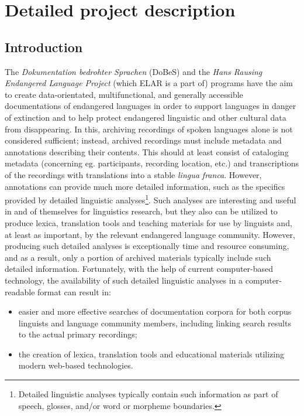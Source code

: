 \documentclass[a4paper,12pt]{article}
\begin{document}

\section{Detailed project description}%
\subsection{Introduction}

The \textit{Dokumentation bedrohter Sprachen} (DoBeS) and the \textit{Hans Rausing Endangered Language Project} (which ELAR is a part of) programs have the aim to create data-orientated, multifunctional, and generally accessible documentations of endangered languages in order to support languages in danger of extinction and to help protect endangered linguistic and other cultural data from disappearing. In this, archiving recordings of spoken languages alone is not considered sufficient; instead, archived recordings must include metadata and annotations describing their contents. This should at least consist of cataloging metadata (concerning eg. participants, recording location, etc.) and transcriptions of the recordings with translations into a stable \textit{lingua franca}. However, annotations can provide much more detailed information, such as the specifics provided by detailed linguistic analyses\footnote{Detailed linguistic analyses typically contain such information as part of speech, glosses, and/or word or morpheme boundaries.}. Such analyses are interesting and useful in and of themselves for linguistics research, but they also can be utilized to produce lexica, translation tools and teaching materials for use by linguists and, at least as important, by the relevant endangered language community. However, producing such detailed analyses is exceptionally time and resource consuming, and as a result, only a portion %
of archived materials typically include such detailed information. Fortunately, with the help of current computer-based technology, the availability of such detailed linguistic analyses in a computer-readable format can result in:
\begin{itemize}
\item easier and more effective searches of documentation corpora for both corpus linguists and language community members, including linking search results to the actual primary recordings;
\item the creation of lexica, translation tools and educational materials utilizing modern web-based technologies.
\end{itemize}
\end{document}
